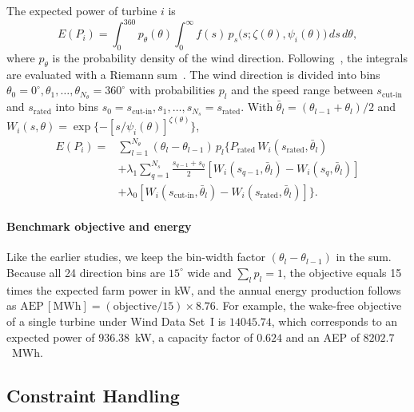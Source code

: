 \documentclass[journal,twoside]{IEEEtran}
\begin{document}
The expected power of turbine $i$ is
\begin{equation}\label{eq8}
E(P_i) = \int_0^{360} p_\theta(\theta) \int_0^{\infty} f(s)\,
       p_s\bigl(s; \zeta(\theta), \psi_i(\theta)\bigr) \, ds \, d\theta ,
\end{equation}
where $p_\theta$ is the probability density of the wind direction. Following~\cite{Kusiak2010}, the integrals are evaluated with a Riemann sum~\cite{Stroock1999}. The wind direction is divided into bins $\theta_0 = 0^\circ, \theta_1, \ldots, \theta_{N_\theta} = 360^\circ$ with probabilities $p_l$ and the speed range between $s_{\text{cut-in}}$ and $s_{\text{rated}}$ into bins $s_0 = s_{\text{cut-in}}, s_1, \ldots, s_{N_s} = s_{\text{rated}}$. With $\bar\theta_l=(\theta_{l-1}+\theta_l)/2$ and $W_i(s,\theta)=\exp\{-[s/\psi_i(\theta)]^{\zeta(\theta)}\}$,
{\small
\begin{align*}
E(P_i) ={}& \sum_{l=1}^{N_\theta} (\theta_l - \theta_{l-1})\, p_l \Bigg\{ P_{\text{rated}}\, W_i(s_{\text{rated}},\bar\theta_l)\\
&+\lambda_1 \sum_{q=1}^{N_s} \frac{s_{q-1} + s_q}{2}\left[W_i(s_{q-1},\bar\theta_l)-W_i(s_q,\bar\theta_l)\right]\\
&+ \lambda_0 \left[W_i(s_{\text{cut-in}},\bar\theta_l)-W_i(s_{\text{rated}},\bar\theta_l)\right] \Bigg\}.
\end{align*}
}

\paragraph*{Benchmark objective and energy}
Like the earlier studies, we keep the bin-width factor $(\theta_l-\theta_{l-1})$ in the sum. Because all 24 direction bins are $15^\circ$ wide and $\sum_l p_l=1$, the objective equals 15 times the expected farm power in kW, and the annual energy production follows as $\mathrm{AEP}\,[\mathrm{MWh}] = (\text{objective}/15)\times 8.76$. For example, the wake-free objective of a single turbine under Wind Data Set~I is $14045.74$, which corresponds to an expected power of $936.38$~kW, a capacity factor of $0.624$ and an AEP of $8202.7$~MWh.

\subsection{Constraint Handling}
\label{sec:constraints}
\end{document}
